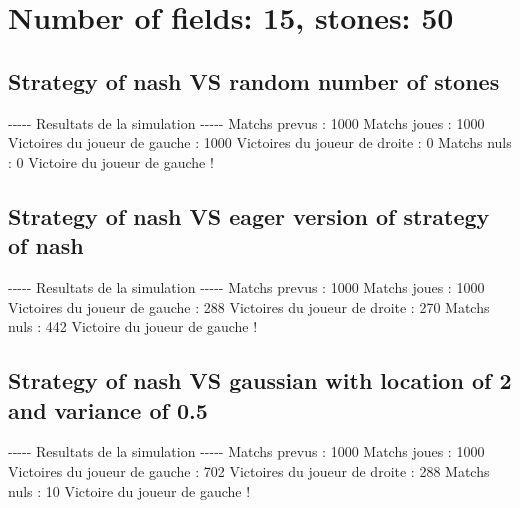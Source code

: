 \documentclass{article}%
\begin{document}
%
\section{Number of fields: 15, stones: 50}%
\label{sec:Number of fields 15, stones 50}%
\subsection{Strategy of nash VS random number of stones}%
\label{subsec:Strategy of nash VS random number of stones}%
{-}{-}{-}{-}{-} Resultats de la simulation {-}{-}{-}{-}{-}\newline%
		\newline%
Matchs prevus : 1000\newline%
Matchs joues : 1000\newline%
\newline%
Victoires du joueur de gauche : 1000\newline%
Victoires du joueur de droite : 0\newline%
Matchs nuls : 0\newline%
\newline%
Victoire du joueur de gauche !

%
\subsection{Strategy of nash VS eager version of strategy of nash}%
\label{subsec:Strategy of nash VS eager version of strategy of nash}%
{-}{-}{-}{-}{-} Resultats de la simulation {-}{-}{-}{-}{-}\newline%
		\newline%
Matchs prevus : 1000\newline%
Matchs joues : 1000\newline%
\newline%
Victoires du joueur de gauche : 288\newline%
Victoires du joueur de droite : 270\newline%
Matchs nuls : 442\newline%
\newline%
Victoire du joueur de gauche !

%
\subsection{Strategy of nash VS gaussian with location of 2 and variance of 0.5}%
\label{subsec:Strategy of nash VS gaussian with location of 2 and variance of 0.5}%
{-}{-}{-}{-}{-} Resultats de la simulation {-}{-}{-}{-}{-}\newline%
		\newline%
Matchs prevus : 1000\newline%
Matchs joues : 1000\newline%
\newline%
Victoires du joueur de gauche : 702\newline%
Victoires du joueur de droite : 288\newline%
Matchs nuls : 10\newline%
\newline%
Victoire du joueur de gauche !
\end{document}
